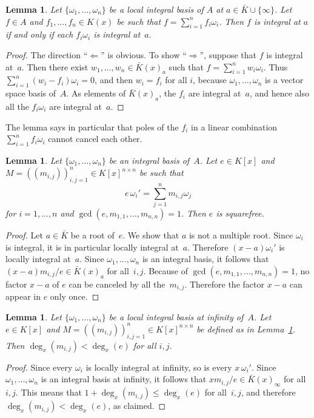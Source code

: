 \documentclass{sig-alternate-05-2015}
\newtheorem{lemma}[theorem]{Lemma}
\begin{document}
\begin{lemma}\label{lemma:1}
  Let $\{\omega_1,\dots,\omega_n\}$ be a local integral basis of $A$ at $a\in\bar K\cup\{\infty\}$.
  Let $f\in A$ and $f_1,\dots,f_n\in K(x)$ be such that $f=\sum_{i=1}^nf_i\omega_i$.
  Then $f$ is integral at $a$ if and only if each $f_i\omega_i$ is integral at~$a$.
\end{lemma}
\begin{proof}
  The direction ``$\Leftarrow$'' is obvious. To show ``$\Rightarrow$'', suppose
  that $f$ is integral at~$a$. Then there exist $w_1,\dots,w_n\in\bar K(x)_a$ such that
  $f=\sum_{i=1}^nw_i\omega_i$. Thus $\sum_{i=1}^n(w_i-f_i)\omega_i=0$, and then
  $w_i=f_i$ for all $i$, because $\omega_1,\dots,\omega_n$ is a vector space basis of~$A$.
  As elements of $\bar K(x)_a$, the $f_i$ are integral at~$a$, and hence also all the $f_i\omega_i$
  are integral at~$a$.
\end{proof}

The lemma says in particular that poles of the $f_i$ in a linear combination
$\sum_{i=1}^n f_i\omega_i$ cannot cancel each other.

\begin{lemma}\label{lemma:e}
  Let $\{\omega_1,\dots,\omega_n\}$ be an integral basis of~$A$.
  Let $e\in K[x]$ and
  $M=((m_{i,j}))_{i,j=1}^n\in K[x]^{n\times n}$ be such that
  \[
    e\,\omega_i'=\sum_{j=1}^n m_{i,j}\omega_j
  \]
  for $i=1,\dots,n$ and $\gcd(e,m_{1,1},\dots,m_{n,n})=1$.
  Then $e$ is squarefree.
\end{lemma}
\begin{proof}
  Let $a\in\bar K$ be a root of~$e$. We show that $a$ is not a multiple root.
  Since $\omega_i$ is integral, it is in particular locally integral at~$a$.
  Therefore $(x-a)\omega_i'$ is locally integral at~$a$.
  Since $\omega_1,\dots,\omega_n$ is an integral basis, it follows that
  $(x-a)m_{i,j}/e\in\bar K(x)_a$ for all~$i,j$.
  Because of $\gcd(e,m_{1,1},\dots,m_{n,n})=1$, no factor $x-a$ of $e$
  can be canceled by all the~$m_{i,j}$.
  Therefore the factor $x-a$ can appear in $e$ only once.
\end{proof}

\begin{lemma} \label{lemma:degM}
  Let $\{\omega_1,\dots,\omega_n\}$ be a local integral basis at infinity of~$A$.
  Let $e\in K[x]$ and $M=((m_{i,j}))_{i,j=1}^n\in K[x]^{n\times n}$
  be defined as in Lemma~\ref{lemma:e}. Then $\deg_x(m_{i,j})<\deg_x(e)$ for all $i,j$.
\end{lemma}
\begin{proof}
  Since every $\omega_i$ is locally integral at infinity, so is every $x\,\omega_i'$.
  Since $\omega_1,\dots,\omega_n$ is an integral basis at infinity, it follows that
  $xm_{i,j}/e\in\bar K(x)_\infty$ for all~$i,j$. This means that $1+\deg_x(m_{i,j})\leq\deg_x(e)$
  for all~$i,j$, and therefore $\deg_x(m_{i,j})<\deg_x(e)$, as claimed.
\end{proof}
\end{document}
